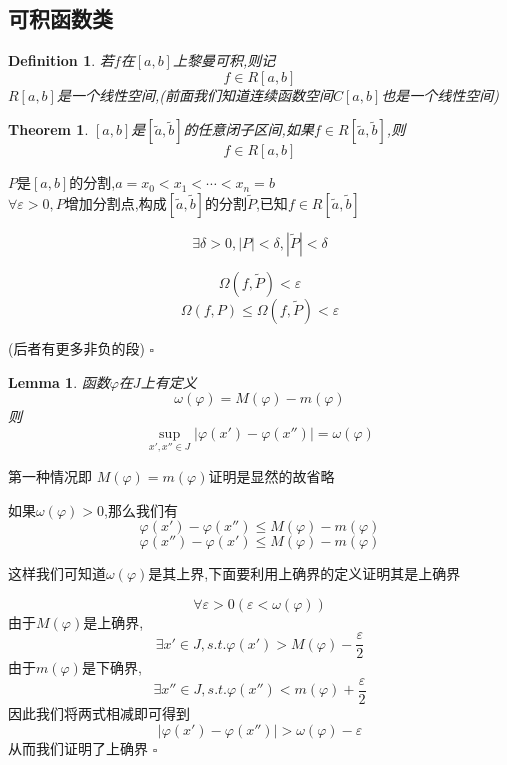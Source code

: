 \documentclass[11pt,hyperref,a4paper,UTF8]{ctexart}
\newtheorem{theorem}{Theorem}[subsection]
\newtheorem{lemma}{Lemma}[subsection]
\newtheorem{definition}{Definition}[subsection]
\newenvironment{cproof}{%
\heiti{证明}\kaishu
}{%
  \hfill $\square$
  \par\bigskip
}
\begin{document}
\begin{CJK}{UTF8}{gkai}
\subsection{可积函数类}
\begin{definition}
若$f$在$[a,b]$上黎曼可积,则记
\[f\in R[a,b]\]
$R[a,b]$是一个线性空间,(前面我们知道连续函数空间$C[a,b]$也是一个线性空间)\\
\end{definition}

\begin{theorem}
  $[a,b]$是$[\tilde{a},\tilde{b}]$的任意闭子区间,如果$f\in R[\tilde{a},\tilde{b}]$,则
  \[f\in R[a,b]\]
\end{theorem}

\begin{cproof}
$P$是$[a,b]$的分割,$a = x_0 < x_1 < \cdots < x_n = b$\\

$\forall \varepsilon > 0,P$增加分割点,构成$[\tilde{a},\tilde{b}]$的分割$\tilde{P}$,已知$f\in R[\tilde{a},\tilde{b}]$

\[\exists \delta > 0,|P| < \delta ,|\tilde{P}| < \delta\]

\[\Omega(f,\tilde{P}) < \varepsilon\]
\[\Omega(f,P) \leq\Omega(f,\tilde{P}) < \varepsilon\]

(后者有更多非负的段)
\end{cproof}

\begin{lemma}
  函数$\varphi$在$J$上有定义
  \[\omega(\varphi) = M(\varphi) - m(\varphi)\]
  则
  \[\sup_{x',x''\in J}|\varphi(x') - \varphi(x'')| = \omega(\varphi)\]
\end{lemma}

\begin{cproof}
  第一种情况即 $M(\varphi) = m(\varphi)$证明是显然的故省略

  如果$\omega(\varphi) > 0$,那么我们有
  \[\varphi(x') - \varphi(x'') \leq M(\varphi) - m(\varphi)\]
  \[ \varphi(x'')-\varphi(x')  \leq M(\varphi) - m(\varphi)\]

  这样我们可知道$\omega(\varphi)$是其上界,下面要利用上确界的定义证明其是上确界

  \[\forall \varepsilon > 0 (\varepsilon < \omega(\varphi))\]
  由于$M(\varphi)$是上确界,\[\exists x'\in J ,s.t.\varphi(x') > M(\varphi) - \dfrac{\varepsilon}{2}\]
  由于$m(\varphi)$是下确界,\[\exists x''\in J ,s.t.\varphi(x'') < m(\varphi) + \dfrac{\varepsilon}{2}\]
  因此我们将两式相减即可得到
  \[|\varphi(x') - \varphi(x'')| > \omega(\varphi) - \varepsilon\]
  从而我们证明了上确界
\end{cproof}


\end{CJK}
\end{document}
